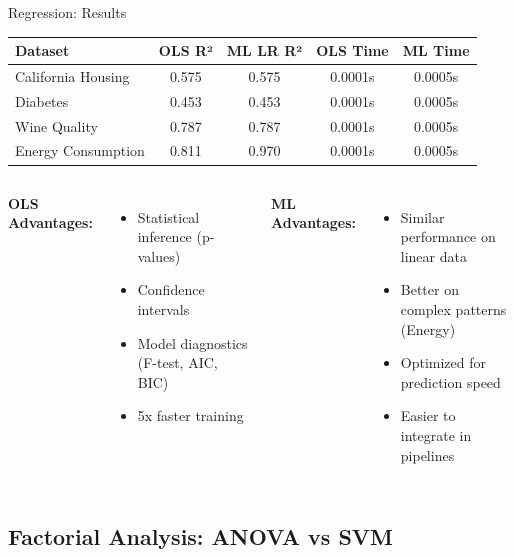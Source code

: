 \documentclass[aspectratio=169,10pt]{beamer}
\begin{document}
\begin{frame}{Regression: Results}
\begin{center}
\begin{tabular}{lcccc}
\toprule
\textbf{Dataset} & \textbf{OLS R²} & \textbf{ML LR R²} & \textbf{OLS Time} & \textbf{ML Time} \\
\midrule
California Housing & 0.575 & 0.575 & 0.0001s & 0.0005s \\
Diabetes & 0.453 & 0.453 & 0.0001s & 0.0005s \\
Wine Quality & 0.787 & 0.787 & 0.0001s & 0.0005s \\
Energy Consumption & 0.811 & 0.970 & 0.0001s & 0.0005s \\
\bottomrule
\end{tabular}
\end{center}

\vspace{0.5cm}

\begin{columns}
\textcolor{statcolor}{\textbf{OLS Advantages:}}
\begin{itemize}
    \item Statistical inference (p-values)
    \item Confidence intervals
    \item Model diagnostics (F-test, AIC, BIC)
    \item 5x faster training
\end{itemize}

\textcolor{mlcolor}{\textbf{ML Advantages:}}
\begin{itemize}
    \item Similar performance on linear data
    \item Better on complex patterns (Energy)
    \item Optimized for prediction speed
    \item Easier to integrate in pipelines
\end{itemize}
\end{columns}
\end{frame}

\subsection{Factorial Analysis: ANOVA vs SVM}
\end{document}

